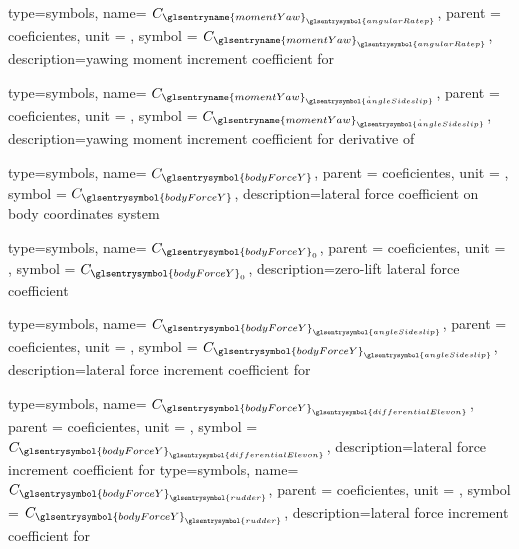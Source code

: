 {type=symbols,
    name= \ensuremath{C_{{\glsentryname{momentYaw}}_{\glsentrysymbol{angularRatep}}}},
    parent = {coeficientes},
    unit = \unexpanded{},
    symbol = \ensuremath{C_{{\glsentryname{momentYaw}}_{\glsentrysymbol{angularRatep}}}},
    description={yawing moment increment coefficient for }
}

{type=symbols,
    name= \ensuremath{C_{{\glsentryname{momentYaw}}_{\dot{\glsentrysymbol{angleSideslip}}}}},
    parent = {coeficientes},
    unit = \unexpanded{},
    symbol = \ensuremath{C_{{\glsentryname{momentYaw}}_{\dot{\glsentrysymbol{angleSideslip}}}}},
    description={yawing moment increment coefficient for derivative of }
}


{type=symbols,
    name= \ensuremath{C_{\glsentrysymbol{bodyForceY}}},
    parent = {coeficientes},
    unit = \unexpanded{},
    symbol = \ensuremath{C_{\glsentrysymbol{bodyForceY}}},
    description={lateral force coefficient on body coordinates system }
}

{type=symbols,
    name= \ensuremath{C_{\glsentrysymbol{bodyForceY}_{0}}},
    parent = {coeficientes},
    unit = \unexpanded{},
    symbol = \ensuremath{C_{\glsentrysymbol{bodyForceY}_{0}}},
    description={zero-lift lateral force coefficient}
}

{type=symbols,
    name= \ensuremath{C_{{\glsentrysymbol{bodyForceY}}_{\glsentrysymbol{angleSideslip}}}},
    parent = {coeficientes},
    unit = \unexpanded{},
    symbol = \ensuremath{C_{{\glsentrysymbol{bodyForceY}}_{\glsentrysymbol{angleSideslip}}}},
    description={lateral force increment coefficient for }
}

{type=symbols,
    name= \ensuremath{C_{{\glsentrysymbol{bodyForceY}}_{\glsentrysymbol{differentialElevon}}}},
    parent = {coeficientes},
    unit = \unexpanded{},
    symbol = \ensuremath{C_{{\glsentrysymbol{bodyForceY}}_{\glsentrysymbol{differentialElevon}}}},
    description={lateral force increment coefficient for }
}
{type=symbols,
    name= \ensuremath{C_{{\glsentrysymbol{bodyForceY}}_{\glsentrysymbol{rudder}}}},
    parent = {coeficientes},
    unit = \unexpanded{},
    symbol = \ensuremath{C_{{\glsentrysymbol{bodyForceY}}_{\glsentrysymbol{rudder}}}},
    description={lateral force increment coefficient for }
}


